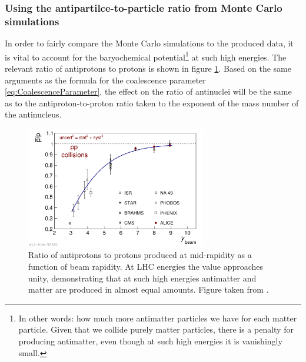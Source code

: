 \subsubsection{Using the antipartilce-to-particle ratio from Monte Carlo simulations}\label{sec:MCSim}
In order to fairly compare the Monte Carlo simulations to the produced data, it is vital to account for the baryochemical potential\footnote{In other words: how much more antimatter particles we have for each matter particle. Given that we collide purely matter particles, there is a penalty for producing antimatter, even though at such high energies it is vanishingly small.} at such high energies. The relevant ratio of antiprotons to protons is shown in figure \ref{fig:BaryochemicalPotential}. Based on the same arguments as the formula for the coalescence parameter \ref{eq:CoalescenceParameter}, the effect on the ratio of antinuclei will be the same as to the antiproton-to-proton ratio taken to the exponent of the mass number of the antinucleus. 

\begin{figure}
    \centering
    \includegraphics[width=0.7\textwidth]{figures/primordial_ratio.pdf}
    \caption{Ratio of antiprotons to protons produced at mid-rapidity as a function of beam rapidity. At LHC energies the value approaches unity, demonstrating that at such high energies antimatter and matter are produced in almost equal amounts. Figure taken from \cite{Abbas_2013_primordial_ratio}.}
    \label{fig:BaryochemicalPotential}
\end{figure}



